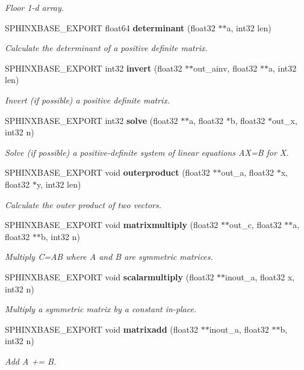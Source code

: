 \begin{DoxyCompactItemize}
\begin{DoxyCompactList}\small\item\em \-Floor 1-\/d array. \end{DoxyCompactList}\item 
\-S\-P\-H\-I\-N\-X\-B\-A\-S\-E\-\_\-\-E\-X\-P\-O\-R\-T float64 {\bf determinant} (float32 $\ast$$\ast$a, int32 len)
\begin{DoxyCompactList}\small\item\em \-Calculate the determinant of a positive definite matrix. \end{DoxyCompactList}\item 
\-S\-P\-H\-I\-N\-X\-B\-A\-S\-E\-\_\-\-E\-X\-P\-O\-R\-T int32 {\bf invert} (float32 $\ast$$\ast$out\-\_\-ainv, float32 $\ast$$\ast$a, int32 len)
\begin{DoxyCompactList}\small\item\em \-Invert (if possible) a positive definite matrix. \end{DoxyCompactList}\item 
\-S\-P\-H\-I\-N\-X\-B\-A\-S\-E\-\_\-\-E\-X\-P\-O\-R\-T int32 {\bf solve} (float32 $\ast$$\ast$a, float32 $\ast$b, float32 $\ast$out\-\_\-x, int32 n)
\begin{DoxyCompactList}\small\item\em \-Solve (if possible) a positive-\/definite system of linear equations \-A\-X=\-B for \-X. \end{DoxyCompactList}\item 
\-S\-P\-H\-I\-N\-X\-B\-A\-S\-E\-\_\-\-E\-X\-P\-O\-R\-T void {\bf outerproduct} (float32 $\ast$$\ast$out\-\_\-a, float32 $\ast$x, float32 $\ast$y, int32 len)
\begin{DoxyCompactList}\small\item\em \-Calculate the outer product of two vectors. \end{DoxyCompactList}\item 
\-S\-P\-H\-I\-N\-X\-B\-A\-S\-E\-\_\-\-E\-X\-P\-O\-R\-T void {\bf matrixmultiply} (float32 $\ast$$\ast$out\-\_\-c, float32 $\ast$$\ast$a, float32 $\ast$$\ast$b, int32 n)
\begin{DoxyCompactList}\small\item\em \-Multiply \-C=\-A\-B where \-A and \-B are symmetric matrices. \end{DoxyCompactList}\item 
\-S\-P\-H\-I\-N\-X\-B\-A\-S\-E\-\_\-\-E\-X\-P\-O\-R\-T void {\bf scalarmultiply} (float32 $\ast$$\ast$inout\-\_\-a, float32 x, int32 n)
\begin{DoxyCompactList}\small\item\em \-Multiply a symmetric matrix by a constant in-\/place. \end{DoxyCompactList}\item 
\-S\-P\-H\-I\-N\-X\-B\-A\-S\-E\-\_\-\-E\-X\-P\-O\-R\-T void {\bf matrixadd} (float32 $\ast$$\ast$inout\-\_\-a, float32 $\ast$$\ast$b, int32 n)
\begin{DoxyCompactList}\small\item\em \-Add \-A += \-B. \end{DoxyCompactList}\end{DoxyCompactItemize}


